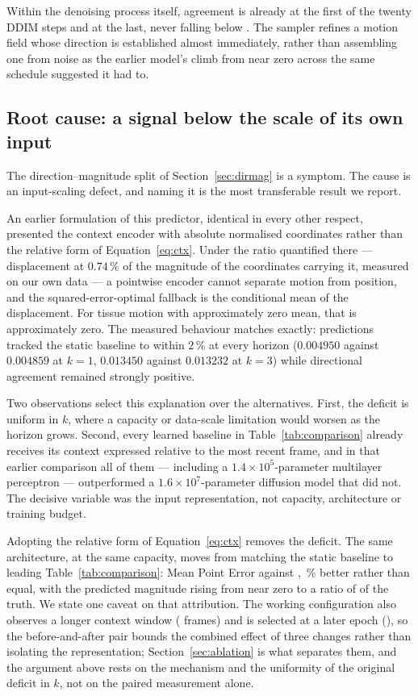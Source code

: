 \documentclass[conference]{IEEEtran}
\begin{document}
Within the denoising process itself, agreement is already \denoiseCosFirst{} at the
first of the twenty DDIM steps and \denoiseCosLast{} at the last, never falling below
\denoiseCosMin{}. The sampler refines a motion field whose direction is established
almost immediately, rather than assembling one from noise as the earlier model's
climb from near zero across the same schedule suggested it had to.

\subsection{Root cause: a signal below the scale of its own input}
\label{sec:rootcause}
The direction--magnitude split of Section~\ref{sec:dirmag} is a symptom. The cause is
an input-scaling defect, and naming it is the most transferable result we report.

An earlier formulation of this predictor, identical in every other respect, presented
the context encoder with absolute normalised coordinates rather than the relative form
of Equation~\ref{eq:ctx}. Under the ratio quantified there --- displacement at $0.74\,\%$
of the magnitude of the coordinates carrying it, measured on our own data --- a
pointwise encoder cannot separate motion from position, and the squared-error-optimal
fallback is the conditional mean of the displacement. For tissue motion with
approximately zero mean, that is approximately zero. The measured behaviour matches
exactly: predictions tracked the static baseline to within $2\,\%$ at every horizon
($0.004950$ against $0.004859$ at $k{=}1$, $0.013450$ against $0.013232$ at $k{=}3$)
while directional agreement remained strongly positive.

Two observations select this explanation over the alternatives. First, the deficit is
uniform in $k$, where a capacity or data-scale limitation would worsen as the horizon
grows. Second, every learned baseline in Table~\ref{tab:comparison} already receives
its context expressed relative to the most recent frame, and in that earlier
comparison all of them --- including a $1.4\times10^{5}$-parameter multilayer
perceptron --- outperformed a $1.6\times10^{7}$-parameter diffusion model that did
not. The decisive variable was the input representation, not capacity, architecture
or training budget.

Adopting the relative form of Equation~\ref{eq:ctx} removes the deficit. The same
architecture, at the same capacity, moves from matching the static baseline to
leading Table~\ref{tab:comparison}: \oursMPE{} Mean Point Error against
\naiveMPE{}, \gainOverStatic{}\,\% better rather than equal, with the predicted
magnitude rising from near zero to a ratio of \magRatioOne{} of the truth. We state
one caveat on that attribution. The working configuration also observes a longer
context window (\ctxWindow{} frames) and is selected at a later epoch
(\bestEpoch{}), so the before-and-after pair bounds the combined effect of three
changes rather than isolating the representation; Section~\ref{sec:ablation} is what
separates them, and the argument above rests on the mechanism and the uniformity of
the original deficit in $k$, not on the paired measurement alone.
\end{document}
